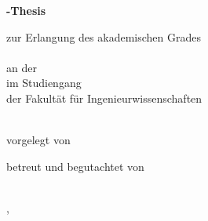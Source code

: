 \begin{titlepage}\linespread{1.5}\selectfont
  \begin{center}
    \large  
    \hfill
    \vfill
    \begingroup
      \Large\bfseries\myDegreeType-Thesis 
    \endgroup
		
		\bigskip
		
    zur Erlangung des akademischen Grades \\
    \myDegree \\ 
    an der \myUni \\
    im Studiengang \myDegreeCourse \\
    der Fakultät für Ingenieurwissenschaften \\ 
    
  \vfill
	
  \begingroup
    \Large\bfseries\myTitle 
  \endgroup
	
	\bigskip
	
  vorgelegt von \\
  \myName
	
  \vfill
	
  betreut und begutachtet von \\
  \myFirstProf \\
  \mySecondProf 
	
  \vfill
	
  \myLocation, \myTime                   

    \end{center}       
\end{titlepage}   
